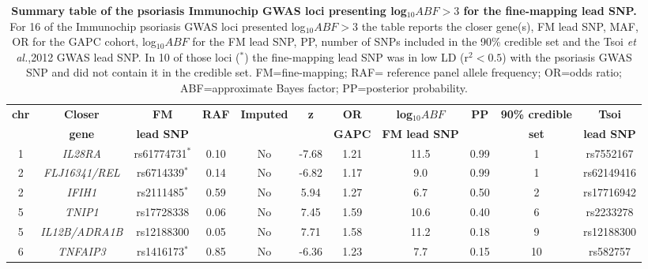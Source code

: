 \begin{landscape}
\begin{center}
\begin{longtable}[ht]{c c c c c c c c c c c}
\caption[Summary table of the psoriasis Immunochip GWAS loci presenting log${_10}ABF>3$ for the fine-mapping lead SNP.]{\textbf{Summary table of the psoriasis Immunochip GWAS loci presenting log${_10}ABF>3$ for the fine-mapping lead SNP.} For 16 of the Immunochip psoriasis GWAS loci presented log${_10}ABF>3$ the table reports the closer gene(s), FM lead SNP, MAF, OR for the GAPC cohort, log${_10}ABF$ for the FM lead SNP, PP, number of SNPs included in the 90\% credible set and the Tsoi \textit{et al.},2012 GWAS lead SNP. In 10 of those loci ($^{\ast}$) the fine-mapping lead SNP was in low LD (r${^2}<0.5$) with the psoriasis GWAS SNP and did not contain it in the credible set. FM=fine-mapping; RAF= reference panel allele frequency; OR=odds ratio; ABF=approximate Bayes factor; PP=posterior probability.}
\label{tab:Psoriasis_fine_mapping_summary} \\
\toprule
\textbf{chr} & \textbf{Closer} & \textbf{FM} & \textbf{RAF} & \textbf{Imputed}& \textbf{z} &\textbf{OR} & \textbf{log${_10}ABF$} & \textbf{PP} & \textbf{90\% credible} &\textbf{Tsoi} \\
              & \textbf{gene} & \textbf{lead SNP} &        &                  &           &\textbf{GAPC} & \textbf{FM lead SNP} &             & \textbf{set}           &\textbf{lead SNP} \\
\midrule
\midrule
1	& \textit{IL28RA}&	     rs61774731$^{\ast}$   &		0.10 &	No	& -7.68 &1.21 &		11.5 &		0.99 &		1	 &	rs7552167 \\
2	& \textit{FLJ16341/REL}& rs6714339$^{\ast}$    &		0.14 &	No	& -6.82 &1.17 &		9.0  &		0.99 &		1	 &	rs62149416 \\
2	& \textit{IFIH1}&		     rs2111485$^{\ast}$    &		0.59 &	No	& 5.94  &1.27 &		6.7  &		0.50 &		2	 &	rs17716942 \\
5	& \textit{TNIP1}&		     rs17728338            &		0.06 &	No	& 7.45  &1.59 &		10.6 &		0.40 &		6	 &	rs2233278 \\
5	& \textit{IL12B/ADRA1B}& rs12188300            &		0.05 &	No	& 7.71  &1.58 &		11.2 &		0.18 &		9	 &	rs12188300 \\
6	& \textit{TNFAIP3}&		   rs1416173$^{\ast}$    &		0.85 &	No	& -6.36 &1.23 &		7.7  &		0.15 &		10 &		rs582757 \\

\end{longtable}
\end{center}
\end{landscape}
